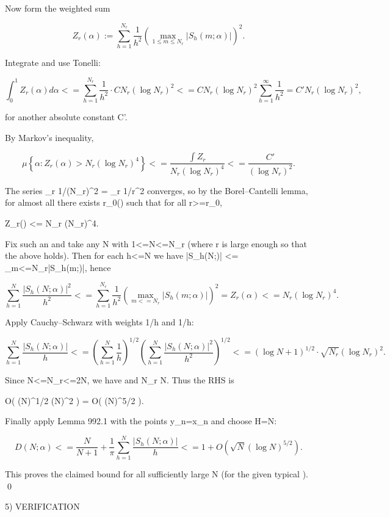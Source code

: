 Now form the weighted sum

\[
  Z_r(\alpha) := \sum_{h=1}^{N_r} \frac{1}{h^2} \left(\max_{1\le m\le N_r} |S_h(m;\alpha)|\right)^2.
\]

Integrate and use Tonelli:

\[
  \int_0^1 Z_r(\alpha) d\alpha
  <= \sum_{h=1}^{N_r} \frac{1}{h^2} \cdot C N_r (\log N_r)^2
  <= C N_r (\log N_r)^2 \sum_{h=1}^\infty \frac{1}{h^2}
  = C' N_r (\log N_r)^2,
\]

for another absolute constant C'.

By Markov's inequality,

\[
  \mu\left\{\alpha : Z_r(\alpha) > N_r (\log N_r)^4\right\}
  <= \frac{\int Z_r}{N_r (\log N_r)^4}
  <= \frac{C'}{(\log N_r)^2}.
\]

The series \sum_r 1/(\log N_r)^2 = \sum_r 1/r^2 converges, so by the Borel--Cantelli lemma,
for almost all \alpha there exists r_0(\alpha) such that for all r>=r_0,

  Z_r(\alpha) <= N_r (\log N_r)^4.

Fix such an \alpha and take any N with 1<=N<=N_r (where r is large enough so that the above
holds). Then for each h<=N we have |S_h(N;\alpha)| <= \max_{m<=N_r}|S_h(m;\alpha)|, hence

\[
  \sum_{h=1}^N \frac{|S_h(N;\alpha)|^2}{h^2}
  <= \sum_{h=1}^{N_r} \frac{1}{h^2} \left(\max_{m<=N_r}|S_h(m;\alpha)|\right)^2
  = Z_r(\alpha)
  <= N_r (\log N_r)^4.
\]

Apply Cauchy--Schwarz with weights 1/h and 1/h:

\[
  \sum_{h=1}^N \frac{|S_h(N;\alpha)|}{h}
  <= \left(\sum_{h=1}^N \frac{1}{h}\right)^{1/2}
     \left(\sum_{h=1}^N \frac{|S_h(N;\alpha)|^2}{h^2}\right)^{1/2}
  <= (\log N +1)^{1/2} \cdot \sqrt{N_r} (\log N_r)^2.
\]

Since N<=N_r<=2N, we have  \ll {} and \log N_r \asymp \log N. Thus the RHS is

  O(  (\log N)^{1/2} (\log N)^2 ) = O(  (\log N)^{5/2} ).

Finally apply Lemma 992.1 with the points y_n={\alpha x_n} and choose H=N:

\[
  D(N;\alpha) <= \frac{N}{N+1} + \frac{1}{\pi} \sum_{h=1}^N \frac{|S_h(N;\alpha)|}{h}
             <= 1 + O( \sqrt{N} (\log N)^{5/2} ).
\]

This proves the claimed bound for all sufficiently large N (for the given typical \alpha).
\qed

5) VERIFICATION

